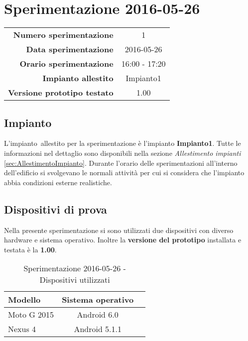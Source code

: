 \documentclass[../Sperimentazione.tex]{subfiles}
\begin{document}
	\section{Sperimentazione 2016-05-26}
	
		\begin{table} [h]
		\centering
		\begin{tabular}[width=0.5\textwidth]{r|c}
			\textbf{Numero sperimentazione} & 1 \\
			\textbf{Data sperimentazione} & 2016-05-26 \\
			\textbf{Orario sperimentazione} & 16:00 - 17:20 \\
			\textbf{Impianto allestito} & Impianto1 \\
			\textbf{Versione prototipo testato} & 1.00 \\		
		\end{tabular}
		\end{table}
	
		
		\subsection{Impianto}
		L'impianto\g\ allestito per la sperimentazione è l'impianto \textbf{Impianto1}. Tutte le informazioni nel dettaglio sono disponibili nella sezione \textit{Allestimento impianti} \ref{sec:AllestimentoImpianto}. Durante l'orario delle sperimentazioni all'interno dell'edificio si svolgevano le normali attività per cui si considera che l'impianto abbia condizioni esterne realistiche.


		\subsection{Dispositivi di prova}
			Nella presente sperimentazione si sono utilizzati due dispositivi con diverso hardware e sistema operativo. Inoltre la \textbf{versione del prototipo} installata e testata è la \textbf{1.00}.
	
			\begin{table} [h]
			\centering
				\begin{tabular}{lcc}
					\textbf{Modello} & \textbf{Sistema operativo} \\
					\toprule
					Moto G 2015 & Android 6.0 \\
					\midrule
					Nexus 4 & Android 5.1.1 \\
					\bottomrule
				\end{tabular}
				\caption{Sperimentazione 2016-05-26 - Dispositivi utilizzati}
				\label{tab:Sperimentazione1Dispositivi}
			\end{table}
		
\end{document}
